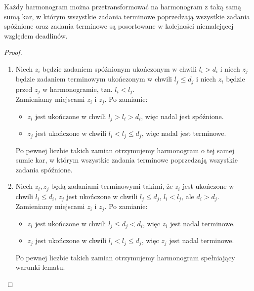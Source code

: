 \begin{lemma}
	Każdy harmonogram można przetransformować na harmonogram z taką samą sumą kar, w którym wszystkie zadania terminowe poprzedzają wszystkie zadania spóźnione oraz zadania terminowe są posortowane w kolejności niemalejącej względem deadlinów.
\end{lemma}
\begin{proof}
	\begin{enumerate}
		\item Niech $z_i$ będzie zadaniem spóźnionym ukończonym w chwili $l_i > d_i$ i niech $z_j$ będzie zadaniem terminowym ukończonym w chwili $l_j \leq d_j$ i niech $z_i$ będzie przed $z_j$ w harmonogramie, tzn. $l_i < l_j$.\\
		Zamieniamy miejscami $z_i$ i $z_j$. Po zamianie:
		\begin{itemize}[nosep]
			\item $z_i$ jest ukończone w chwili $l_j > l_i > d_i$, więc nadal jest spóźnione.
			\item $z_j$ jest ukończone w chwili $l_i < l_j \leq d_j$, więc nadal jest terminowe.
		\end{itemize}
		Po pewnej liczbie takich zamian otrzymujemy harmonogram o tej samej sumie kar, w którym wszystkie zadania terminowe poprzedzają wszystkie zadania spóźnione.
		
		\item Niech $z_i, z_j$ będą zadaniami terminowymi takimi, że $z_i$ jest ukończone w chwili $l_i \leq d_i$, $z_j$ jest ukończone w chwili $l_j \leq d_j$, $l_i < l_j$, ale $d_i > d_j$.\\
		Zamieniamy miejscami $z_i$ i $z_j$. Po zamianie:
		\begin{itemize}[nosep]
			\item $z_i$ jest ukończone w chwili $l_j \leq d_j < d_i$, więc $z_i$ jest nadal terminowe.
			\item $z_j$ jest ukończone w chwili $l_i < l_j \leq d_j$, więc $z_j$ jest nadal terminowe.
		\end{itemize}
		Po pewnej liczbie takich zamian otrzymujemy harmonogram spełniający warunki lematu.
	\end{enumerate}
\end{proof}